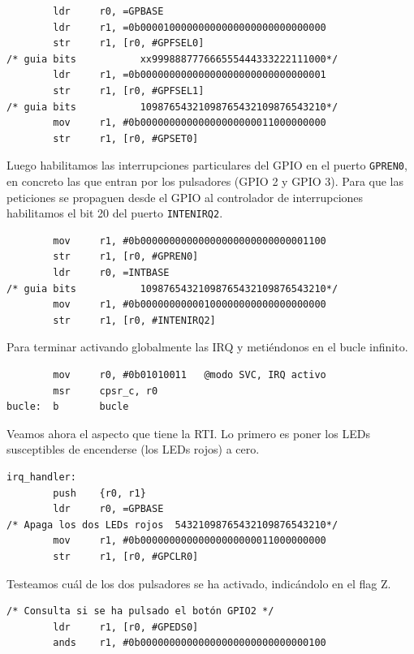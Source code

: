 \begin{lstlisting}
        ldr     r0, =GPBASE
        ldr     r1, =0b00001000000000000000000000000000
        str     r1, [r0, #GPFSEL0]
/* guia bits           xx999888777666555444333222111000*/
        ldr     r1, =0b00000000000000000000000000000001
        str     r1, [r0, #GPFSEL1]
/* guia bits           10987654321098765432109876543210*/
        mov     r1, #0b00000000000000000000011000000000
        str     r1, [r0, #GPSET0]
\end{lstlisting}

Luego habilitamos las interrupciones particulares del GPIO en el puerto
{\tt GPREN0}, en concreto las que entran por los pulsadores (GPIO 2 y GPIO 3). 
Para que las peticiones se propaguen desde el GPIO al controlador de interrupciones
habilitamos el bit 20 del puerto {\tt INTENIRQ2}.

\begin{lstlisting}
        mov     r1, #0b00000000000000000000000000001100
        str     r1, [r0, #GPREN0]
        ldr     r0, =INTBASE
/* guia bits           10987654321098765432109876543210*/
        mov     r1, #0b00000000000100000000000000000000
        str     r1, [r0, #INTENIRQ2]
\end{lstlisting}

Para terminar activando globalmente las IRQ y metiéndonos en el bucle infinito.

\begin{lstlisting}
        mov     r0, #0b01010011   @modo SVC, IRQ activo
        msr     cpsr_c, r0
bucle:  b       bucle
\end{lstlisting}

Veamos ahora el aspecto que tiene la RTI. Lo primero es poner los LEDs susceptibles de
encenderse (los LEDs rojos) a cero.

\begin{lstlisting}
irq_handler:
        push    {r0, r1}
        ldr     r0, =GPBASE
/* Apaga los dos LEDs rojos  54321098765432109876543210*/
        mov     r1, #0b00000000000000000000011000000000
        str     r1, [r0, #GPCLR0]
\end{lstlisting}

Testeamos cuál de los dos pulsadores se ha activado, indicándolo en el flag Z.

\begin{lstlisting}
/* Consulta si se ha pulsado el botón GPIO2 */
        ldr     r1, [r0, #GPEDS0]
        ands    r1, #0b00000000000000000000000000000100
\end{lstlisting}

